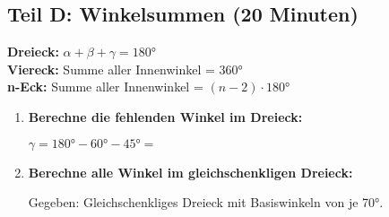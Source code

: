 \subsection*{Teil D: Winkelsummen (20 Minuten)}

\begin{merkbox}[Winkelsummen]
    \textbf{Dreieck:} $\alpha + \beta + \gamma = 180°$\\
    \textbf{Viereck:} Summe aller Innenwinkel = 360°\\
    \textbf{n-Eck:} Summe aller Innenwinkel = $(n-2) \cdot 180°$
\end{merkbox}

\begin{enumerate}[label=\arabic*., resume]

    \item \textbf{Berechne die fehlenden Winkel im Dreieck:}

    \vspace{0.5cm}

    \begin{center}
    \end{center}

    $\gamma = 180° - 60° - 45° = $ \underline{\hspace{3cm}}

    \vspace{1cm}

    \item \textbf{Berechne alle Winkel im gleichschenkligen Dreieck:}

    \vspace{0.5cm}

    Gegeben: Gleichschenkliges Dreieck mit Basiswinkeln von je 70°.

    \begin{center}
    \end{center}


\end{enumerate}
